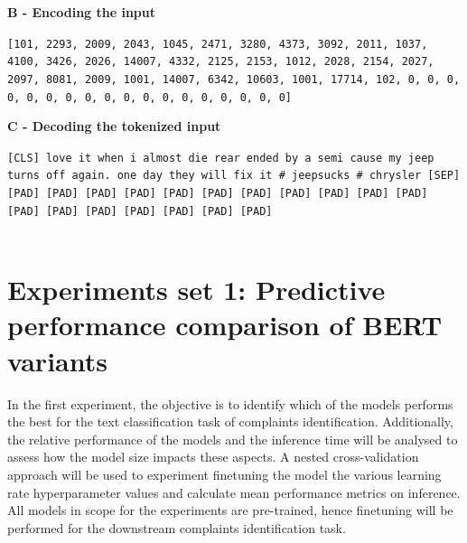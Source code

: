 \textbf{B - Encoding the input}\newline

\begin{adjustbox}{minipage={\textwidth},fbox}
    \texttt{[101, 2293, 2009, 2043, 1045, 2471, 3280, 4373, 3092, 2011, 1037, 4100, 3426,
                2026, 14007, 4332, 2125, 2153, 1012, 2028, 2154, 2027, 2097, 8081, 2009, 1001,
                14007, 6342, 10603, 1001, 17714, 102, 0, 0, 0, 0, 0, 0, 0, 0, 0, 0, 0, 0, 0,
                0, 0, 0, 0, 0]}
\end{adjustbox} \newline\newline

\textbf{C - Decoding the tokenized input}\newline

\begin{adjustbox}{minipage={\textwidth},fbox}
    \texttt{[CLS] love it when i almost die rear ended by a semi cause my jeep turns off
        again. one day they will fix it \# jeepsucks \# chrysler [SEP] [PAD] [PAD] [PAD]
            [PAD] [PAD] [PAD] [PAD] [PAD] [PAD] [PAD] [PAD] [PAD] [PAD] [PAD] [PAD] [PAD]
            [PAD] [PAD]}
\end{adjustbox}\\ \\

\section{Experiments set 1: Predictive performance comparison of BERT variants}
In the first experiment, the objective is to identify which of the models performs the best for the text classification task of complaints identification. Additionally, the relative performance of the models and the inference time will be analysed to assess how the model size impacts these aspects. A nested cross-validation approach will be used to experiment finetuning the model the various learning rate hyperparameter values and calculate mean performance metrics on inference. All models in scope for the experiments are pre-trained, hence finetuning will be performed for the downstream complaints identification task.\\

